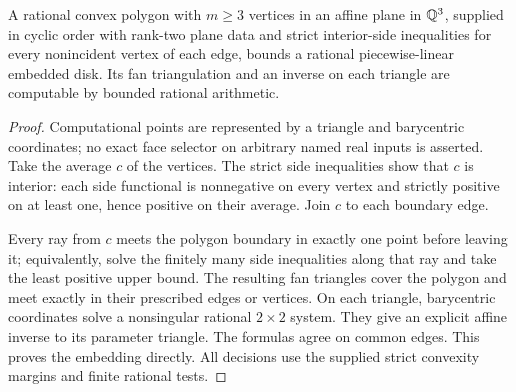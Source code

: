 \begin{theorem}
A rational convex polygon with $m\geq3$ vertices in an affine plane in $\mathbb Q^3$, supplied in cyclic order with rank-two plane data and strict interior-side inequalities for every nonincident vertex of each edge, bounds a rational piecewise-linear embedded disk. Its fan triangulation and an inverse on each triangle are computable by bounded rational arithmetic.
\end{theorem}
\begin{proof}
Computational points are represented by a triangle and barycentric coordinates; no exact face selector on arbitrary named real inputs is asserted. Take the average $c$ of the vertices. The strict side inequalities show that $c$ is interior: each side functional is nonnegative on every vertex and strictly positive on at least one, hence positive on their average. Join $c$ to each boundary edge.

Every ray from $c$ meets the polygon boundary in exactly one point before leaving it; equivalently, solve the finitely many side inequalities along that ray and take the least positive upper bound. The resulting fan triangles cover the polygon and meet exactly in their prescribed edges or vertices. On each triangle, barycentric coordinates solve a nonsingular rational $2\times2$ system. They give an explicit affine inverse to its parameter triangle. The formulas agree on common edges. This proves the embedding directly. All decisions use the supplied strict convexity margins and finite rational tests.
\end{proof}

